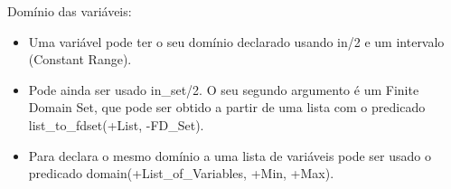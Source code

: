 \documentclass[../resumosPLOG.tex]{subfiles}
\begin{document}
 

Domínio das variáveis:
\begin{itemize}
    \item Uma variável pode ter o seu domínio declarado usando in/2 e um intervalo (Constant Range).
    \item Pode ainda ser usado in\_set/2. O seu segundo argumento é um Finite Domain Set, que pode ser obtido a partir de uma lista com o predicado list\_to\_fdset(+List, -FD\_Set).
    \item Para declara o mesmo domínio a uma lista de variáveis pode ser usado o predicado domain(+List\_of\_Variables, +Min, +Max).
\end{itemize}
\end{document}
